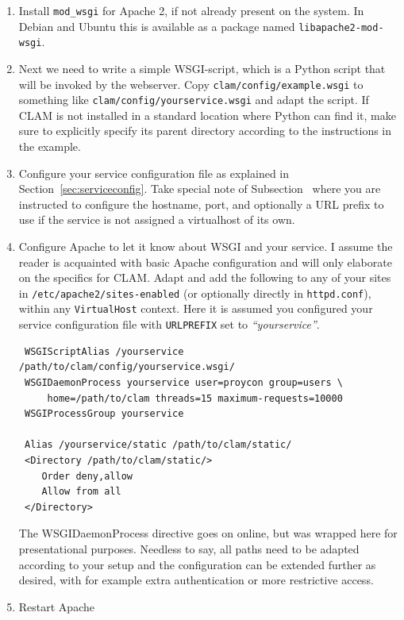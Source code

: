 \documentclass[a4paper,12pt]{report}
\begin{document}
\begin{enumerate}
\item Install \texttt{mod\_wsgi} for Apache 2, if not already present on the system. In Debian and Ubuntu this is available as a package named \texttt{libapache2-mod-wsgi}.
\item Next we need to write a simple WSGI-script, which is a Python script that will be invoked by the webserver. Copy \texttt{clam/config/example.wsgi} to something like  \texttt{clam/config/yourservice.wsgi} and adapt the script. If CLAM is not installed in a standard location where Python can find it, make sure to explicitly specify its parent directory according to the instructions in the example.
\item Configure your service configuration file as explained in Section~\ref{sec:serviceconfig}. Take special note of Subsection~\label{sec:sadmin} where you are instructed to configure the hostname, port, and optionally a URL prefix to use if the service is not assigned a virtualhost of its own.
\item Configure Apache to let it know about WSGI and your service. I assume the reader is acquainted with basic Apache configuration and will only elaborate on the specifics for CLAM. Adapt and add the following to any of your sites in \texttt{/etc/apache2/sites-enabled} (or optionally directly in \texttt{httpd.conf}), within any \texttt{VirtualHost} context. Here it is assumed you configured your service configuration file with \texttt{URLPREFIX} set to \emph{``yourservice''}.

\begin{verbatim}
 WSGIScriptAlias /yourservice /path/to/clam/config/yourservice.wsgi/
 WSGIDaemonProcess yourservice user=proycon group=users \
     home=/path/to/clam threads=15 maximum-requests=10000
 WSGIProcessGroup yourservice

 Alias /yourservice/static /path/to/clam/static/
 <Directory /path/to/clam/static/>
    Order deny,allow
    Allow from all
 </Directory>
\end{verbatim}

The WSGIDaemonProcess directive goes on online, but was wrapped here for presentational purposes. Needless to say, all paths need to be adapted according to your setup and the configuration can be extended further as desired, with for example extra authentication or more restrictive access. 

\item Restart Apache
\end{enumerate}
\end{document}
